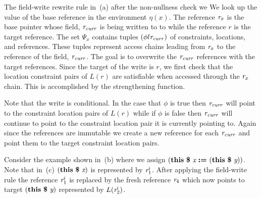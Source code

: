 The field-write rewrite rule in~(a) after the
non-nullness check we We look up the value of the base reference in
the environment $\eta(x)$.  The reference $\emph{r}_x$ is the base pointer
whose field, $\emph{r}_\mathit{curr}$ is being written to to while the
reference $r$ is the target reference. The set $\Psi_x$ contains
tuples $(\phi l \emph{r}_\mathit{curr})$ of constraints, locations, and
references. These tuples represent access chains leading from $\emph{r}_x$ to
the reference of the field, $\emph{r}_\mathit{curr}$. The goal is to
overwrite the $\emph{r}_\mathit{curr}$ references with the target
references. Since the target of the write is $r$, we first check that
the location constraint pairs of $L(r)$ are satisfiable when accessed
through the $\emph{r}_x$ chain. This is accomplished by the strengthening
function.



Note that the write is conditional. In the case that $\phi$ is true
then $\emph{r}_\mathit{curr}$ will point to the constraint location pairs of
$L(r)$ while if $\phi$ is false then $\emph{r}_\mathit{curr}$ will continue
to point to the constraint location pair it is currently pointing to.
Again since the references are immutable we create a new reference for
each $\emph{r}_\mathit{curr}$ and point them to the target constraint
location pairs.

Consider the example shown in~(b) where we assign
$\lp\cfgt{this}\  \cfgt{\$}\ \cfgnt{x}\ \cfgt{:=}\ \lp\cfgt{this}\  \cfgt{\$}\ \cfgnt{y}\rp\rp$. Note that
in~(c) $\lp\cfgt{this}\  \cfgt{\$}\ \cfgnt{x}\rp$ is represented by
$\emph{r}_1^i$. After applying the field-write rule the reference $\emph{r}_1^i$ is
replaced by the fresh reference $\emph{r}_4$ which now points to target
 $\lp\cfgt{this}\  \cfgt{\$}\ \cfgnt{y}\rp$ represented by $L(\emph{r}_2^i)$.


\begin{comment}
\begin{figure}[t]
\begin{center}
\begin{tabular}[c]{l}
$\Psi_x = \{ (true, \cfgnt{l}_0, \cfgnt{r}_1^i) \}$\\
$ST (L, \cfgnt{r}_3^s, \phi, \phi_g)$ \\
$\theta = \{ (\phi_{2a}\; \cfgnt{l}_\mathit{null} ) (\phi_{2b}\; \cfgnt{l}_2) (\phi_{2c}\; \cfgnt{l}_1) \}$\\
$ST(L, \cfgnt{r}_0, \phi, \phi_g)$\\
$\theta = \{ \}$\\
\end{tabular}
\end{center}
\caption{FIXME: When will I get a caption}
\label{fig:faHeapSets}
\end{figure}
\end{comment}



